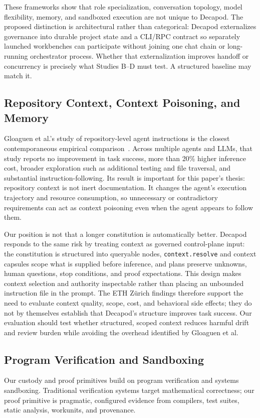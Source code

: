 These frameworks show that role specialization, conversation topology, model flexibility, memory, and sandboxed execution are not unique to Decapod. The proposed distinction is architectural rather than categorical: Decapod externalizes governance into durable project state and a CLI/RPC contract so separately launched workbenches can participate without joining one chat chain or long-running orchestrator process. Whether that externalization improves handoff or concurrency is precisely what Studies B--D must test. A structured baseline may match it.

\subsection{Repository Context, Context Poisoning, and Memory}
Gloaguen et al.'s study of repository-level agent instructions is the closest contemporaneous empirical comparison~\cite{gloaguen2026agentsmd}. Across multiple agents and LLMs, that study reports no improvement in task success, more than 20\% higher inference cost, broader exploration such as additional testing and file traversal, and substantial instruction-following. Its result is important for this paper's thesis: repository context is not inert documentation. It changes the agent's execution trajectory and resource consumption, so unnecessary or contradictory requirements can act as context poisoning even when the agent appears to follow them.

Our position is not that a longer constitution is automatically better. Decapod responds to the same risk by treating context as governed control-plane input: the constitution is structured into queryable nodes, \texttt{context.resolve} and context capsules scope what is supplied before inference, and plans preserve unknowns, human questions, stop conditions, and proof expectations. This design makes context selection and authority inspectable rather than placing an unbounded instruction file in the prompt. The ETH Zürich findings therefore support the need to evaluate context quality, scope, cost, and behavioral side effects; they do not by themselves establish that Decapod's structure improves task success. Our evaluation should test whether structured, scoped context reduces harmful drift and review burden while avoiding the overhead identified by Gloaguen et al.

\subsection{Program Verification and Sandboxing}
Our custody and proof primitives build on program verification and systems sandboxing. Traditional verification systems target mathematical correctness; our proof primitive is pragmatic, configured evidence from compilers, test suites, static analysis, workunits, and provenance.

